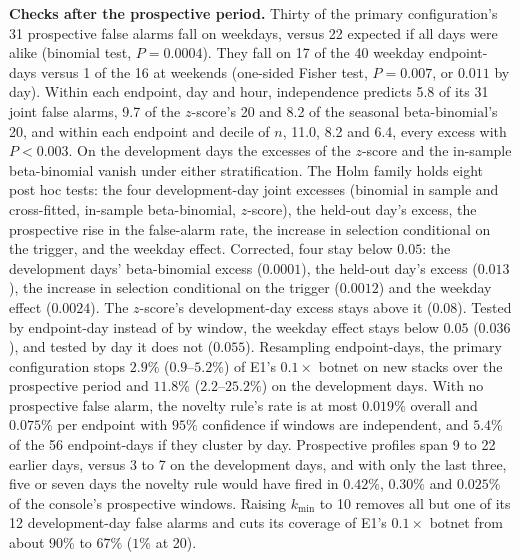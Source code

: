 \documentclass[conference,letterpaper,10pt]{IEEEtran}
\newcommand\1{\textit{(i)}}
\newcommand\2{\textit{(ii)}}
\newcommand\3{\textit{(iii)}}
\newcommand\4{\textit{(iv)}}
\newcommand\5{\textit{(v)}}
\newcommand\6{\textit{(vi)}}
\newcommand\7{\textit{(vii)}}
\newcommand\8{\textit{(viii)}}
\newcommand\9{\textit{(ix)}}
\begin{document}
\textbf{Checks after the prospective period.} Thirty of the primary configuration's 31 prospective false alarms fall on weekdays, versus 22 expected if all days were alike (binomial test, $P = 0.0004$). They fall on 17 of the 40 weekday endpoint-days versus 1 of the 16 at weekends (one-sided Fisher test, $P = 0.007$, or $0.011$ by day). Within each endpoint, day and hour, independence predicts 5.8 of its 31 joint false alarms, 9.7 of the $z$-score's 20 and 8.2 of the seasonal beta-binomial's 20, and within each endpoint and decile of $n$, 11.0, 8.2 and 6.4, every excess with $P < 0.003$. On the development days the excesses of the $z$-score and the in-sample beta-binomial vanish under either stratification. The Holm family holds eight post hoc tests: the four development-day joint excesses (binomial in sample and cross-fitted, in-sample beta-binomial, $z$-score), the held-out day's excess, the prospective rise in the false-alarm rate, the increase in selection conditional on the trigger, and the weekday effect. Corrected, four stay below $0.05$: the development days' beta-binomial excess ($0.0001$), the held-out day's excess ($0.013$), the increase in selection conditional on the trigger ($0.0012$) and the weekday effect ($0.0024$). The $z$-score's development-day excess stays above it ($0.08$). Tested by endpoint-day instead of by window, the weekday effect stays below $0.05$ ($0.036$), and tested by day it does not ($0.055$). Resampling endpoint-days, the primary configuration stops $2.9\%$ ($0.9$--$5.2\%$) of E1's $0.1\times$ botnet on new stacks over the prospective period and $11.8\%$ ($2.2$--$25.2\%$) on the development days. With no prospective false alarm, the novelty rule's rate is at most $0.019\%$ overall and $0.075\%$ per endpoint with $95\%$ confidence if windows are independent, and $5.4\%$ of the 56 endpoint-days if they cluster by day. Prospective profiles span 9 to 22 earlier days, versus 3 to 7 on the development days, and with only the last three, five or seven days the novelty rule would have fired in $0.42\%$, $0.30\%$ and $0.025\%$ of the console's prospective windows. Raising $k_{\min}$ to 10 removes all but one of its 12 development-day false alarms and cuts its coverage of E1's $0.1\times$ botnet from about $90\%$ to $67\%$ ($1\%$ at 20).
\end{document}
